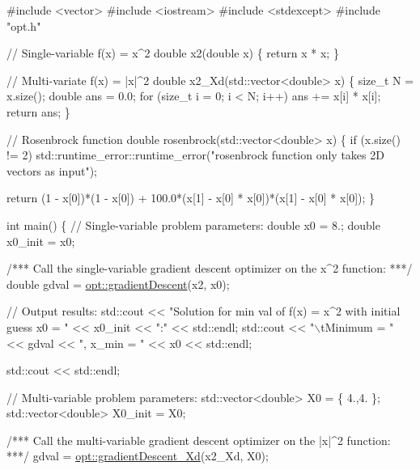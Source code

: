 \begin{DoxyCodeInclude}
\textcolor{preprocessor}{#include <vector>}
\textcolor{preprocessor}{#include <iostream>}
\textcolor{preprocessor}{#include <stdexcept>}
\textcolor{preprocessor}{#include "opt.h"}

\textcolor{comment}{// Single-variable f(x) = x^2}
\textcolor{keywordtype}{double} x2(\textcolor{keywordtype}{double} x)
\{
    \textcolor{keywordflow}{return} x * x;
\}

\textcolor{comment}{// Multi-variate f(x) = |x|^2}
\textcolor{keywordtype}{double} x2\_Xd(std::vector<double> x)
\{
    \textcolor{keywordtype}{size\_t} N = x.size();
    \textcolor{keywordtype}{double} ans = 0.0;
    \textcolor{keywordflow}{for} (\textcolor{keywordtype}{size\_t} i = 0; i < N; i++)
        ans += x[i] * x[i];
    \textcolor{keywordflow}{return} ans;
\}

\textcolor{comment}{// Rosenbrock function}
\textcolor{keywordtype}{double} rosenbrock(std::vector<double> x)
\{
    \textcolor{keywordflow}{if} (x.size() != 2)
        std::runtime\_error::runtime\_error(\textcolor{stringliteral}{"rosenbrock function only takes 2D vectors as input"});

    \textcolor{keywordflow}{return} (1 - x[0])*(1 - x[0]) + 100.0*(x[1] - x[0] * x[0])*(x[1] - x[0] * x[0]);
\}

\textcolor{keywordtype}{int} main()
\{
    \textcolor{comment}{// Single-variable problem parameters:}
    \textcolor{keywordtype}{double} x0 = 8.;
    \textcolor{keywordtype}{double} x0\_init = x0;

    \textcolor{comment}{/*** Call the single-variable gradient descent optimizer on the x^2 function: ***/}
    \textcolor{keywordtype}{double} gdval = \mbox{\hyperlink{namespaceopt_af1ef2e32062af31429ae74fc07c57fb0}{opt::gradientDescent}}(x2, x0);

    \textcolor{comment}{// Output results:}
    std::cout << \textcolor{stringliteral}{"Solution for min val of f(x) = x^2 with initial guess x0 = "} << x0\_init << \textcolor{stringliteral}{":"} << 
      std::endl;
    std::cout <<  \textcolor{stringliteral}{"\(\backslash\)tMinimum = "} << gdval << \textcolor{stringliteral}{", x\_min = "} << x0 << std::endl;

    std::cout << std::endl;

    \textcolor{comment}{// Multi-variable problem parameters:}
    std::vector<double> X0 = \{ 4.,4. \};
    std::vector<double> X0\_init = X0;

    \textcolor{comment}{/*** Call the multi-variable gradient descent optimizer on the |x|^2 function: ***/}
    gdval = \mbox{\hyperlink{namespaceopt_a7db27c86e1c5a503b7f8373ba067d97b}{opt::gradientDescent\_Xd}}(x2\_Xd, X0);


\end{DoxyCodeInclude}

